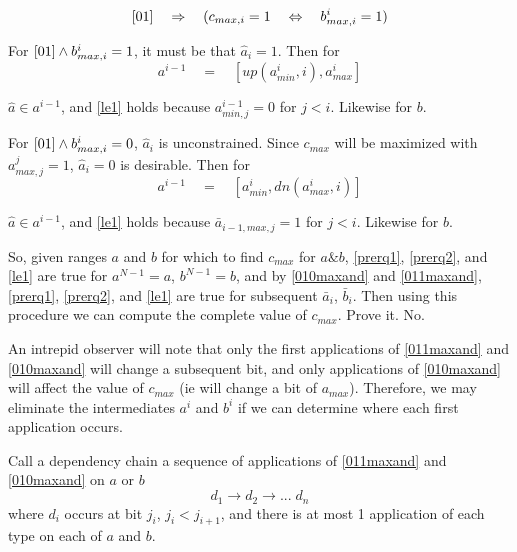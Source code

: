 \documentclass{article}
\begin{document}
\begin{equation*}
\eqref{01} \quad \Rightarrow 
\quad (c_{max,i} = 1 \quad \Leftrightarrow \quad 
b^i_{max,i} = 1)
\end{equation*}


For $\eqref{01} \wedge b^i_{max,i} = 1$, it must be that $\hat a_i = 1$. 
Then for
\begin{equation}\label{011maxand} 
a^{i-1} \quad = \quad [up(a^i_{min}, i), a^i_{max}]
\end{equation}

$\hat a \in a^{i-1}$, and
\eqref{le1} holds because $a^{i-1}_{min,j} = 0$ for $j < i$.
Likewise for $b$.
\vspace{10pt}

For $\eqref{01} \wedge b^i_{max,i} = 0$, $\hat a_i$ is unconstrained.
Since $c_{max}$ will be maximized with $a^j_{max,j} = 1$, 
$\hat a_i = 0$ is desirable. Then for
\begin{equation}\label{010maxand} 
a^{i-1} \quad = \quad [a^i_{min}, dn(a^i_{max},i)]
\end{equation}

$\hat a \in a^{i-1}$, and
\eqref{le1} holds because $\bar a_{i-1,max,j} = 1$ for $j<i$.  
Likewise for $b$.
\vspace{10pt}

So, given ranges $a$ and $b$ for which to find $c_{max}$ for $a\&b$,
\eqref{prerq1}, \eqref{prerq2}, and \eqref{le1} are true for 
$a^{N-1}=a$, $b^{N-1}=b$, and by
\eqref{010maxand} and \eqref{011maxand}, \eqref{prerq1}, \eqref{prerq2}, 
and \eqref{le1} are true for 
subsequent $\bar a_i$, $\bar b_i$. Then using this procedure 
we can compute the complete value of $c_{max}$. Prove it. No.
\vspace{10pt}

An intrepid observer will note that only the first applications of
\eqref{011maxand} and \eqref{010maxand} will change a subsequent bit, and only
applications of \eqref{010maxand} will affect the value of $c_{max}$ (ie will 
change a bit of $a_{max}$). Therefore, we may eliminate the intermediates 
$a^i$ and $b^i$ if we can determine where each first application occurs. 

\vspace{10pt}
Call a dependency chain a sequence of applications of 
\eqref{011maxand} and \eqref{010maxand} on $a$ or $b$
\begin{equation*}
d_1 \rightarrow d_2 \rightarrow ... \; d_n
\end{equation*}
where $d_i$ occurs at bit $j_i$, $j_i < j_{i+1}$, and there is at most 1 
application of each type on each of $a$ and $b$.
\vspace{10pt}
\end{document}
